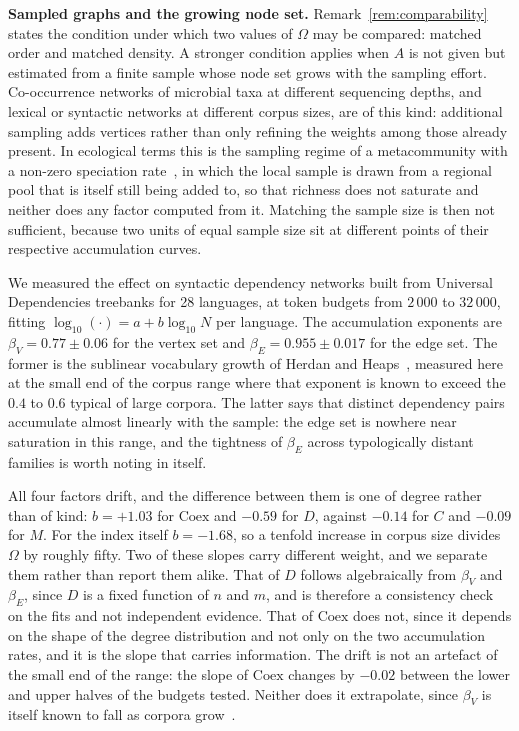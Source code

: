 \documentclass[11pt,a4paper]{article}
\begin{document}
\textbf{Sampled graphs and the growing node set.}
Remark~\ref{rem:comparability} states the condition under which two values
of $\Omega$ may be compared: matched order and matched density. A stronger
condition applies when $A$ is not given but estimated from a finite sample
whose node set grows with the sampling effort. Co-occurrence networks of
microbial taxa at different sequencing depths, and lexical or syntactic
networks at different corpus sizes, are of this kind: additional sampling
adds vertices rather than only refining the weights among those already
present. In ecological terms this is the sampling regime of a metacommunity
with a non-zero speciation rate~\cite{hubbell2001}, in which the local
sample is drawn from a regional pool that is itself still being added to,
so that richness does not saturate and neither does any factor computed
from it. Matching the sample size is then not sufficient, because two units
of equal sample size sit at different points of their respective
accumulation curves.

We measured the effect on syntactic dependency networks built from
Universal Dependencies treebanks for 28 languages, at token budgets from
$2\,000$ to $32\,000$, fitting $\log_{10}(\cdot) = a + b \log_{10} N$ per
language. The accumulation exponents are $\beta_V = 0.77 \pm 0.06$ for the
vertex set and $\beta_E = 0.955 \pm 0.017$ for the edge set. The former is
the sublinear vocabulary growth of Herdan and Heaps~\cite{heaps1978},
measured here at the small end of the corpus range where that exponent is
known to exceed the $0.4$ to $0.6$ typical of large corpora. The latter
says that distinct dependency pairs accumulate almost linearly with the
sample: the edge set is nowhere near saturation in this range, and the
tightness of $\beta_E$ across typologically distant families is worth noting
in itself.

All four factors drift, and the difference between them is one of degree
rather than of kind: $b = +1.03$ for $\mathrm{Coex}$ and $-0.59$ for $D$,
against $-0.14$ for $C$ and $-0.09$ for $M$. For the index itself
$b = -1.68$, so a tenfold increase in corpus size divides $\Omega$ by
roughly fifty. Two of these slopes carry different weight, and we separate
them rather than report them alike. That of $D$ follows algebraically from
$\beta_V$ and $\beta_E$, since $D$ is a fixed function of $n$ and $m$, and is
therefore a consistency check on the fits and not independent evidence.
That of $\mathrm{Coex}$ does not, since it depends on the shape of the
degree distribution and not only on the two accumulation rates, and it is
the slope that carries information. The drift is not an artefact of the
small end of the range: the slope of $\mathrm{Coex}$ changes by $-0.02$
between the lower and upper halves of the budgets tested. Neither does it
extrapolate, since $\beta_V$ is itself known to fall as corpora
grow~\cite{gerlach2013}.
\end{document}
